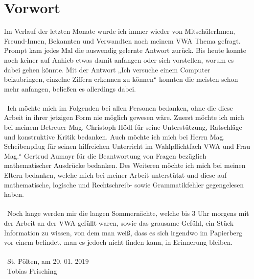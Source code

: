 \documentclass[a4paper,12pt,ngerman,oneside]{scrreprt}	%
\begin{document}
	\chapter*{Vorwort}\label{Vorwort}
		Im Verlauf der letzten Monate wurde ich immer wieder von MitschülerInnen, Freund-Innen, Bekannten und Verwandten nach meinem VWA Thema gefragt. Prompt kam jedes Mal die auswendig gelernte Antwort zurück. Bis heute konnte noch keiner auf Anhieb etwas damit anfangen oder sich vorstellen, worum es dabei gehen könnte. Mit der Antwort „Ich versuche einem Computer beizubringen, einzelne Ziffern erkennen zu können“ konnten die meisten schon mehr anfangen, beließen es allerdings dabei. 
		\\ \
		\\ \
		Ich möchte mich im Folgenden bei allen Personen bedanken, ohne die diese Arbeit in ihrer jetzigen Form nie möglich gewesen wäre. Zuerst möchte ich mich bei meinem Betreuer Mag. Christoph Hödl für seine Unterstützung, Ratschläge und konstruktive Kritik bedanken. Auch möchte ich mich bei Herrn Mag. Scheibenpflug für seinen hilfreichen Unterricht im Wahlpflichtfach VWA und Frau Mag.$^{\textrm{a}}$ Gertrud Aumayr für die Beantwortung von Fragen bezüglich mathematischer Ausdrücke bedanken. Des Weiteren möchte ich mich bei meinen Eltern bedanken, welche mich bei meiner Arbeit unterstützt und diese auf mathematische, logische und Rechtschreib- sowie Grammatikfehler gegengelesen haben. 
		\\ \
		\\ \
		Noch lange werden mir die langen Sommernächte, welche bis 3 Uhr morgens mit der Arbeit an der VWA gefüllt waren, sowie das grausame Gefühl, ein Stück Information zu wissen, von dem man weiß, dass es sich irgendwo im Papierberg vor einem befindet, man es jedoch nicht finden kann, in Erinnerung bleiben. 
		\\ \ 
		\\ \
		St. Pölten, am 20. 01. 2019 \\ \
		Tobias Prisching
		\thispagestyle{empty}
	
\end{document}
